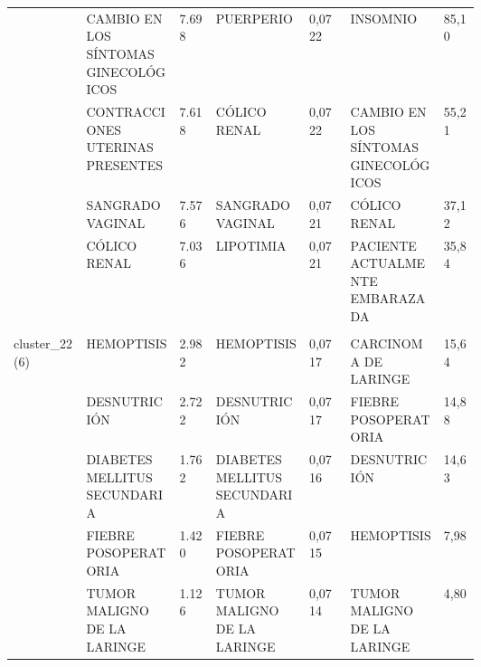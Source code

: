 \begin{landscape}
\begin{longtable}[c]{@{}lp{0.2\linewidth}lp{0.2\linewidth}lp{0.2\linewidth}l@{}}
                                  & CAMBIO EN LOS SÍNTOMAS GINECOLÓGICOS                          & 7.698  & PUERPERIO                                              & 0,0722 & INSOMNIO                                                      & 85,10    \\
                                  & CONTRACCIONES UTERINAS PRESENTES                              & 7.618  & CÓLICO RENAL                                           & 0,0722 & CAMBIO EN LOS SÍNTOMAS GINECOLÓGICOS                          & 55,21    \\
                                  & SANGRADO VAGINAL                                              & 7.576  & SANGRADO VAGINAL                                       & 0,0721 & CÓLICO RENAL                                                  & 37,12    \\
                                  & CÓLICO RENAL                                                  & 7.036  & LIPOTIMIA                                              & 0,0721 & PACIENTE ACTUALMENTE EMBARAZADA                               & 35,84    \\ \\
\multirow{6}{*}{cluster\_22(6)}   & HEMOPTISIS                                                    & 2.982  & HEMOPTISIS                                             & 0,0717 & CARCINOMA DE LARINGE                                          & 15,64    \\
                                  & DESNUTRICIÓN                                                  & 2.722  & DESNUTRICIÓN                                           & 0,0717 & FIEBRE POSOPERATORIA                                          & 14,88    \\
                                  & DIABETES MELLITUS SECUNDARIA                                  & 1.762  & DIABETES MELLITUS SECUNDARIA                           & 0,0716 & DESNUTRICIÓN                                                  & 14,63    \\
                                  & FIEBRE POSOPERATORIA                                          & 1.420  & FIEBRE POSOPERATORIA                                   & 0,0715 & HEMOPTISIS                                                    & 7,98     \\
                                  & TUMOR MALIGNO DE LA LARINGE                                   & 1.126  & TUMOR MALIGNO DE LA LARINGE                            & 0,0714 & TUMOR MALIGNO DE LA LARINGE                                   & 4,80     \\

\end{longtable}
\end{landscape}

